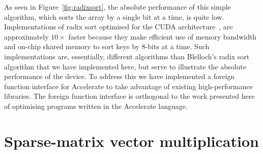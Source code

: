 As seen in Figure~\ref{fig:radixsort}, the absolute performance of this simple
algorithm, which sorts the array by a single bit at a time, is quite low.
Implementations of radix sort optimised for the CUDA
architecture~\cite{Satish:2009kx,Merrill:2011bz,ThrustAParallelT:ub}, are
approximately $10\times$ faster because they make efficient use of memory
bandwidth and on-chip shared memory to sort keys by 8-bits at a time. Such
implementations are, essentially, different algorithms than Blelloch's radix
sort algorithm that we have implemented here, but serve to illustrate the
absolute performance of the device. To address this we have implemented a
foreign function interface for Accelerate to take advantage of existing
high-performance libraries. The foreign function interface is orthogonal to the
work presented here of optimising programs written in the Accelerate language.


\section{Sparse-matrix vector multiplication}
\label{sec:smvm}

\newcommand\spyplot[1]{\parbox[c][1.1cm][c]{1.1cm}{\texttt{[image: images/sec-6/smvm/\#1]}}}

